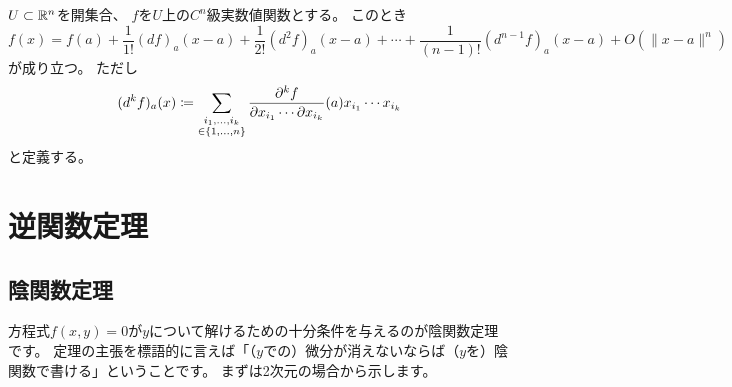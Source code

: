 \documentclass[report]{jlreq}
\begin{document}
\begin{theorem}
    $U \subset \mathbb{R}^n$を開集合、
    $f$を$U$上の$C^n$級実数値関数とする。
    このとき
    \begin{equation}
        f(x)
            =
                f(a)
                    + \frac{1}{1!} (df)_a (x - a)
                    + \frac{1}{2!} (d^2 f)_a (x - a)
                    + \cdots
                    + \frac{1}{(n - 1)!} (d^{n - 1} f)_a (x - a)
                    + O(\| x - a \|^n)
    \end{equation}
    が成り立つ。
    ただし
    \begin{equation}
        (d^k f)_a (x)
            \coloneqq
                \sum_{
                    \substack{
                        i_1, \ldots, i_k \\
                        \in \{ 1, \ldots, n \}
                    }
                }
                    \frac{\partial^k f}{\partial x_{i_1} \cdots \partial x_{i_k}} (a)
                    x_{i_1} \cdots x_{i_k}
    \end{equation}
    と定義する。
\end{theorem}


%
\chapter{逆関数定理}

%
\section{陰関数定理}

方程式$f(x, y) = 0$が$y$について解けるための十分条件を与えるのが陰関数定理です。
定理の主張を標語的に言えば「（$y$での）微分が消えないならば（$y$を）陰関数で書ける」ということです。
まずは2次元の場合から示します。
\end{document}
